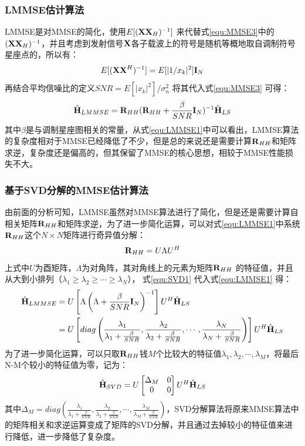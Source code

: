 \subsubsection{LMMSE估计算法}
LMMSE是对MMSE的简化，使用$E[(\textbf X \textbf X_H)^{-1}]$ 来代替式\ref{equ:MMSE3}中的$(\textbf X \textbf X_H)^{-1}$\cite{付可2015lte}，并且考虑到发射信号$\textbf X$各子载波上的符号是随机等概地取自调制符号星座点的，所以有：
\begin{equation}
E[(\textbf X \textbf X^H)^{-1}]=E[|1/x_k|^2]\textbf I_N
\end{equation}
再结合平均信噪比的定义$SNR=E[|x_k|^2]/{\sigma_n^2}$ 将其代入式\ref{equ:MMSE3} 可得：
\begin{equation}
\hat{\textbf H}_{LMMSE}=\textbf R_{HH}(\textbf R_{HH}+\frac{\beta}{SNR}\textbf I_N)^{-1}\hat{\textbf H}_{LS}
\label{equ:LMMSE1}
\end{equation}
其中$\beta$是与调制星座图相关的常量\cite{张乃元2010lte}，从式\ref{equ:LMMSE1}中可以看出，LMMSE算法的复杂度相对于MMSE已经降低了不少，但是总的来说还是需要计算$\textbf R_{HH}$和矩阵求逆，复杂度还是偏高的，但其保留了MMSE的核心思想，相较于MMSE性能损失不大。
\subsubsection{基于SVD分解的MMSE估计算法}
由前面的分析可知，LMMSE虽然对MMSE算法进行了简化，但是还是需要计算自相关矩阵$\textbf R_{HH}$和矩阵求逆，为了进一步简化运算，可以对式\ref{equ:LMMSE1}中系统$\textbf R_{HH}$这个$N\times N$矩阵进行奇异值分解：
\begin{equation}
\textbf R_{HH} = U \Lambda U^H
\label{equ:SVD1}
\end{equation}
上式中$U$为酉矩阵，$\Lambda$为对角阵，其对角线上的元素为矩阵$\textbf R_{HH}$ 的特征值，并且从大到小排列（$\lambda_1\geq\lambda_2\geq\cdots\geq\lambda_N$）， 式\ref{equ:SVD1} 代入式\ref{equ:LMMSE1} 得：
\begin{equation}
\begin{aligned}
\hat{\textbf H}_{LMMSE}&=U\left[\Lambda\left(\Lambda+\frac{\beta}{SNR}\textbf I_N\right)^{-1}\right]U^H\hat{\textbf H}_{LS} \\
&=U\left[diag\left(\frac{\lambda_1}{\lambda_1+\frac{\beta}{SNR}},\frac{\lambda_2}{\lambda_2+\frac{\beta}{SNR}},\cdots,\frac{\lambda_N}{\lambda_N+\frac{\beta}{SNR}}\right)\right]U^H\hat{\textbf H}_{LS}
\end{aligned}
\end{equation}
为了进一步简化运算，可以只取$\textbf R_{HH}$钱$M$个比较大的特征值$\lambda_1,\lambda_2,\cdots,\lambda_M$，将最后N-M个较小的特征值为零，记为：
\begin{equation}
\hat{\textbf H}_{SVD}=U \begin{bmatrix}\Delta_M & 0 \\ 0 & 0 \end{bmatrix} U^H \hat{\textbf H}_{LS}
\end{equation}
其中$\Delta_M = diag\left(\frac{\lambda_1}{\lambda_1+\frac{\beta}{SNR}},\frac{\lambda_2}{\lambda_2+\frac{\beta}{SNR}},\cdots,\frac{\lambda_M}{\lambda_M+\frac{\beta}{SNR}}\right)$，SVD分解算法将原来MMSE算法中的矩阵相关和求逆运算变成了矩阵的SVD分解，并且通过去掉较小的特征值来进行降低，进一步降低了复杂度。
